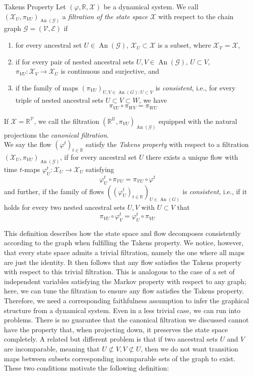 \documentclass[11pt, a4paper]{memoir}
\theoremstyle{break}
\theoremstyle{break}
\theoremstyle{nonumberplain}
\newcommand{\mR}{\mathbb{R}}
\DeclareMathOperator{\an}{An}
\begin{document}
\begin{mydefinition}{Takens Property}
Let $(\varphi,\mR,\mathcal{X})$ be a dynamical system. We call $(\mathcal{X}_U,\pi_{VU})_{\an(\mathcal{G})}$ a \emph{filtration of the state space $\mathcal{X}$} with respect to the chain graph $\mathcal{G}=(\mathcal{V},\mathcal{E})$ if
\begin{enumerate}[label=(\roman*)]
\item for every ancestral set $U\in \an(\mathcal{G})$, $\mathcal{X}_U\subset \mathcal{X}$ is a subset, where $\mathcal{X}_{\mathcal{V}}=\mathcal{X}$,
\item if for every pair of nested ancestral sets $U,V\in \an(\mathcal{G})$, $U\subset V$, $\pi_{VU}:\mathcal{X}_V\to \mathcal{X}_U$ is continuous and surjective, and
\item if the family of maps $(\pi_{VU})_{U,V\in \an(G): U\subset V}$ is \emph{consistent}, i.e., for every triple of nested ancestral sets $U\subset V\subset W$, we have
$$\pi_{VU}\circ \pi_{WV}=\pi_{WU}$$
\end{enumerate}
If $\mathcal{X}=\mR^\mathcal{V}$, we call the filtration $(\mR^{\mathcal{U}},\pi_{VU})_{\an(\mathcal{G})}$ equipped with the natural projections the \emph{canonical filtration}.\\[5pt]
We say the flow $(\varphi^t)_{t\in \mR}$ satisfy the \emph{Takens property} with respect to a filtration $(\mathcal{X}_U,\pi_{VU})_{\an(\mathcal{G})}$, if for every ancestral set $U$ there exists a unique flow with time $t$-maps $\varphi^t_U: \mathcal{X}_U\to\mathcal{X}_U$ satisfying
$$\varphi^t_{U}\circ \pi_{\mathcal{V}U}=\pi_{\mathcal{V}U}\circ \varphi^t$$
and further, if the family of flows $((\varphi_U^t)_{t\in \mR})_{U\in \an(G)}$ is \emph{consistent}, i.e., if it holds for every two nested ancestral sets $U,V$ with $U\subset V$ that
$$\pi_{VU}\circ\varphi_V^t=\varphi_U^t\circ \pi_{VU}$$
\end{mydefinition}
This definition describes how the state space and flow decomposes consistently according to the graph when fulfilling the Takens property. We notice, however, that every state space admits a trivial filtration, namely the one where all maps are just the identity. It then follows that any flow satisfies the Takens property with respect to this trivial filtration. This is analogous to the case of a set of independent variables satisfying the Markov property with respect to any graph; here, we can tune the filtration to ensure any flow satisfies the Takens property. Therefore, we need a corresponding faithfulness assumption to infer the graphical structure from a dynamical system. Even in a less trivial case, we can run into problems. There is no guarantee that the canonical filtration we discussed cannot have the property that, when projecting down, it preserves the state space completely. A related but different problem is that if two ancestral sets $U$ and $V$ are incomparable, meaning that $U\not\subset V, V\not\subset U$, then we do not want transition maps between subsets corresponding incomparable sets of the graph to exist. These two conditions motivate the following definition:
\end{document}
